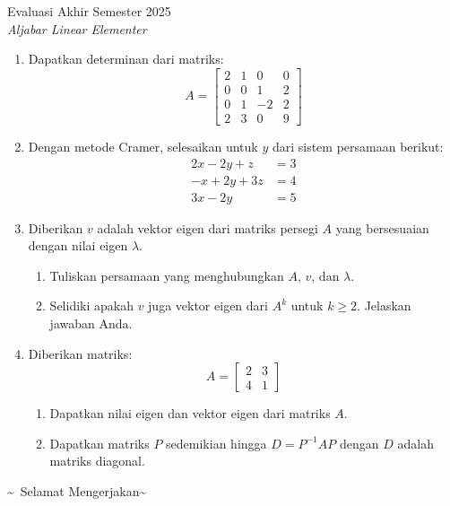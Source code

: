 \documentclass[12pt]{article}
\begin{document}
\begin{center}
    {Evaluasi Akhir Semester 2025} \\
    \textit{Aljabar Linear Elementer} \\
\end{center}

\vspace{0.5cm}

\begin{enumerate}
    \item Dapatkan determinan dari matriks:
    \[
    A = \begin{bmatrix}
    2 & 1 & 0 & 0 \\
    0 & 0 & 1 & 2 \\
    0 & 1 & -2 & 2 \\
    2 & 3 & 0 & 9
    \end{bmatrix}
    \]

    \item Dengan metode Cramer, selesaikan untuk $y$ dari sistem persamaan berikut:
    \[
    \begin{aligned}
    2x - 2y + z &= 3 \\
    -x + 2y + 3z &= 4 \\
    3x - 2y &= 5
    \end{aligned}
    \]

    \item Diberikan $v$ adalah vektor eigen dari matriks persegi $A$ yang bersesuaian dengan nilai eigen $\lambda$.
    \begin{enumerate}[label=\alph*.]
        \item Tuliskan persamaan yang menghubungkan $A$, $v$, dan $\lambda$.
        \item Selidiki apakah $v$ juga vektor eigen dari $A^k$ untuk $k \geq 2$. Jelaskan jawaban Anda.
    \end{enumerate}

    \item Diberikan matriks:
    \[
    A = \begin{bmatrix}
    2 & 3 \\
    4 & 1
    \end{bmatrix}
    \]
    \begin{enumerate}[label=\alph*.]
        \item Dapatkan nilai eigen dan vektor eigen dari matriks $A$.
        \item Dapatkan matriks $P$ sedemikian hingga $D = P^{-1} A P$ dengan $D$ adalah matriks diagonal.
    \end{enumerate}
\end{enumerate}

\vspace{1cm}
\begin{center}
    \textasciitilde\ Selamat Mengerjakan\textasciitilde
\end{center}
\end{document}
